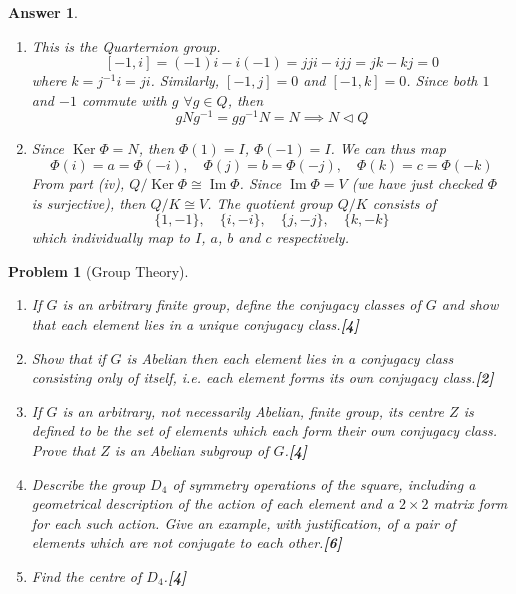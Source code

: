 \documentclass[a4paper]{article}
\DeclareMathOperator{\normal}{\lhd}
\DeclareMathOperator{\isomo}{\cong}
\DeclareMathOperator{\Ker}{Ker}
\DeclareMathOperator{\im}{Im}
\newtheorem{ans}{Answer}[section]
\theoremstyle{new}
\newtheorem{qns}{Problem}[section]
\begin{document}
\begin{ans}
\begin{enumerate}[label=(\roman*)]
where $\phi$ is a homomorphism $\implies$ $\overline{\phi}$ is a homomorphism.\\[5pt]
$\overline{\phi}$ is surjective, so $\im(\phi)$ consists elements of the form $\phi(g)$. If $\overline{\phi}(a\Ker(\phi))=e\implies\phi(a)=e\implies a\in\Ker(\phi)$. But $a\Ker(\phi)=e\Ker(\phi)$, so $\Ker(\overline{\phi})=\{a\Ker(\phi)\}$, so $\overline{\phi}$ is injective. Thus, $\overline{\phi}$ is a bijection, and hence a group isomorphism.
\item This is the Quarternion group.
$$[-1,i]=(-1)i-i(-1)=jji-ijj=jk-kj=0$$
where $k=j^{-1}i=ji$. Similarly, $[-1,j]=0$ and $[-1,k]=0$. Since both $1$ and $-1$ commute with $g$ $\forall g\in Q$, then
$$gNg^{-1}=gg^{-1}N=N\implies N\normal Q$$
\item Since $\Ker\Phi=N$, then $\Phi(1)=I$, $\Phi(-1)=I$. We can thus map
$$\Phi(i)=a=\Phi(-i),\quad \Phi(j)=b=\Phi(-j),\quad\Phi(k)=c=\Phi(-k)$$
From part (iv), $Q/\Ker\Phi\isomo\im\Phi$. Since $\im\Phi=V$ (we have just checked $\Phi$ is surjective), then $Q/K\isomo V$. The quotient group $Q/K$ consists of 
$$\{1,-1\},\quad\{i,-i\},\quad\{j,-j\},\quad\{k,-k\}$$
which individually map to $I$, $a$, $b$ and $c$ respectively.
\end{enumerate}
\end{ans}
\begin{qns}[Group Theory]\leavevmode
\begin{enumerate}[label=(\roman*)]
    \item If $G$ is an arbitrary finite group, define the conjugacy classes of $G$ and show that each element lies in a unique conjugacy class.\hfill\textbf{[4]}
    \item Show that if $G$ is Abelian then each element lies in a conjugacy class consisting only of itself, i.e. each element forms its own conjugacy class.\hfill\textbf{[2]}
    \item If $G$ is an arbitrary, not necessarily Abelian, finite group, its centre $Z$ is defined to be the set of elements which each form their own conjugacy class. Prove that $Z$ is an Abelian subgroup of $G$.\hfill\textbf{[4]}
    \item Describe the group $D_4$ of symmetry operations of the square, including a geometrical description of the action of each element and a $2\times 2$ matrix form for each such action. Give an example, with justification, of a pair of elements which are not conjugate to each other.\hfill\textbf{[6]}
    \item Find the centre of $D_4$.\hfill\textbf{[4]}
\end{enumerate}
\end{qns}
\end{document}

